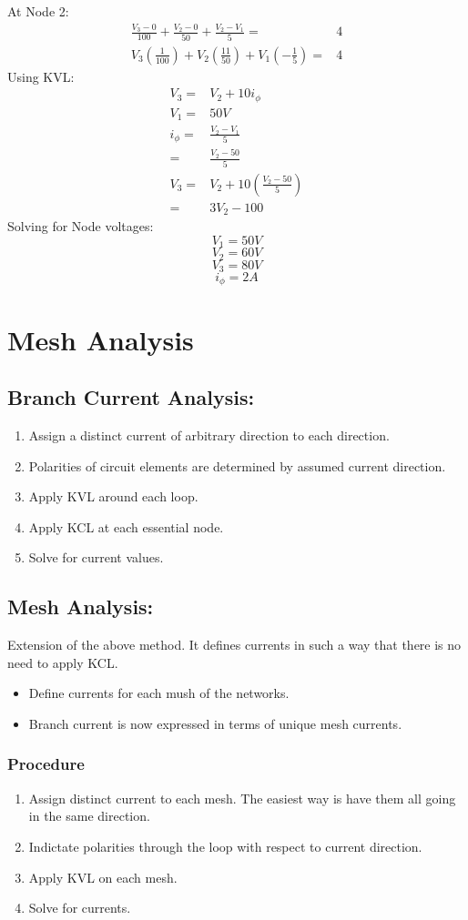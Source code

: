 \documentclass[a5paper]{article}
\begin{document}
	At Node 2:
	\begin{align*}
		\frac{V_{3}-0}{100}+\frac{V_{2}-0}{50}+\frac{V_{2}-V_{1}}{5}=&4\\
		V_{3}(\frac{1}{100})+V_{2}(\frac{11}{50})+V_{1}(-\frac{1}{5})=&4
	\end{align*}
	Using KVL:
	\begin{align*}
		V_{3}=&V_{2}+10i_{\phi}\\
		V_{1}=&50V\\
		i_{\phi}=&\frac{V_{2}-V_{1}}{5}\\
		=&\frac{V_{2}-50}{5}\\
		V_{3}=&V_{2}+10(\frac{V_{2}-50}{5})\\
		=&3V_{2}-100
	\end{align*}
	Solving for Node voltages:
	$$V_{1}=50V$$
	$$V_{2}=60V$$
	$$V_{3}=80V$$
	$$i_{\phi}=2A$$

	\section{Mesh Analysis}
	\subsection{Branch Current Analysis:}
	\begin{enumerate}
		\item Assign a distinct current of arbitrary direction to each direction.
		\item Polarities of circuit elements are determined by assumed current direction.
		\item Apply KVL around each loop.
		\item Apply KCL at each essential node.
		\item Solve for current values.
	\end{enumerate}
	\subsection{Mesh Analysis:}
	Extension of the above method. It defines currents in such a way that there is no need to apply KCL.
	\begin{itemize}
		\item Define currents for each mush of the networks.
		\item Branch current is now expressed in terms of unique mesh currents.
	\end{itemize}
	\subsubsection{Procedure}
	\begin{enumerate}
		\item Assign distinct current to each mesh. The easiest way is have them all going in the same direction.
		\item Indictate polarities through the loop with respect to current direction.
		\item Apply KVL on each mesh.
		\item Solve for currents.
	\end{enumerate}
\end{document}
